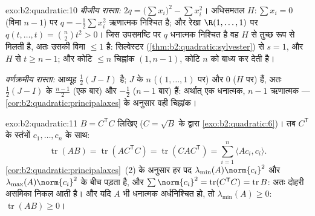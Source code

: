 \begin{solution}{exo:b2:quadratic:10}
\emph{बीजीय रास्ता:} $2q = \bigl(\sum x_i\bigr)^2 - \sum
x_i^2$। अधिसमतल $H : \sum x_i = 0$ (विमा $n -
1$) पर $q = -\frac12\sum x_i^2$ ऋणात्मक निश्चित
है; और रेखा $\R(1, \dots, 1)$ पर $q(t, \dots, t) = \binom n2 t^2 > 0$। जिस उपसमष्टि पर $q$ धनात्मक निश्चित है वह $H$ से
तुच्छ रूप से मिलती है, अतः उसकी विमा $\leq 1$ है: सिल्वेस्टर (\cref{thm:b2:quadratic:sylvester}) से $s = 1$, और
$H$ से $t \geq n-1$; और कोटि $\leq n$ चिह्नांक $(1, n-1)$, कोटि $n$ को बाध्य कर देती है।

\emph{वर्णक्रमीय रास्ता:} आव्यूह $\frac12(J - I)$ है; $J$ के  $n$ ($(1,\dots,1)$
पर) और $0$ ($H$ पर) हैं, अतः $\frac12(J-I)$ के  $\frac{n-1}{2}$ (एक बार) और $-\frac12$
($n-1$ बार) हैं: अर्थात् एक धनात्मक, $n-1$ ऋणात्मक --- \cref{cor:b2:quadratic:principalaxes} के अनुसार वही
चिह्नांक।
\end{solution}

\begin{solution}{exo:b2:quadratic:11}
$B = C^{\mathsf T}C$ लिखिए ($C =
\sqrt B$ के द्वारा \cref{exo:b2:quadratic:6})। तब $C^{\mathsf T}$ के स्तंभों $c_1, \dots, c_n$ के साथ:
\[
\operatorname{tr}(AB) = \operatorname{tr}(AC^{\mathsf T}C)
= \operatorname{tr}(CAC^{\mathsf T})
= \sum_{i=1}^n \langle A c_i, c_i\rangle .
\]
\cref{cor:b2:quadratic:principalaxes}~(2) के अनुसार हर पद $\lambda_{\min}(A)\norm{c_i}^2$ और $\lambda_{\max}(A)\norm{c_i}^2$ के बीच पड़ता है, और $\sum\norm{c_i}^2 =
\operatorname{tr}(C^{\mathsf T}C)^{\vphantom1} =
\operatorname{tr} B$: अतः दोहरी
असमिका निकल आती है। और यदि $A$ भी धनात्मक अर्धनिश्चित हो, तो $\lambda_{\min}(A) \geq 0$:
$\operatorname{tr}(AB) \geq 0$।
\end{solution}

